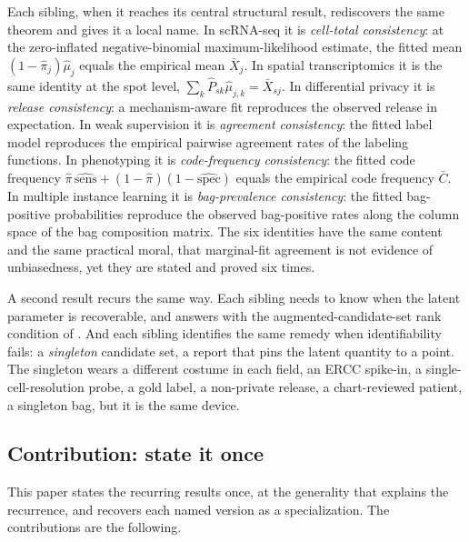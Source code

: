 Each sibling, when it reaches its central structural result,
rediscovers the same theorem and gives it a local name. In scRNA-seq
it is \emph{cell-total consistency}: at the zero-inflated
negative-binomial maximum-likelihood estimate, the fitted mean
$(1-\hat\pi_j)\hat\mu_j$ equals the empirical mean $\bar X_j$. In
spatial transcriptomics it is the same identity at the spot level,
$\sum_k \hat P_{sk}\hat\mu_{j,k} = \bar X_{sj}$. In differential
privacy it is \emph{release consistency}: a mechanism-aware fit
reproduces the observed release in expectation. In weak supervision it
is \emph{agreement consistency}: the fitted label model reproduces the
empirical pairwise agreement rates of the labeling functions. In
phenotyping it is \emph{code-frequency consistency}: the fitted code
frequency $\hat\pi\,\widehat{\mathrm{sens}} +
(1-\hat\pi)(1-\widehat{\mathrm{spec}})$ equals the empirical code
frequency $\bar C$. In multiple instance learning it is
\emph{bag-prevalence consistency}: the fitted bag-positive probabilities
reproduce the observed bag-positive rates along the column space of the
bag composition matrix. The six identities have the same content and the
same practical moral, that marginal-fit agreement is not evidence of
unbiasedness, yet they are stated and proved six times.

A second result recurs the same way. Each sibling needs to know when
the latent parameter is recoverable, and answers with the
augmented-candidate-set rank condition of \citet{towell2026masked}.
And each sibling identifies the same remedy when identifiability
fails: a \emph{singleton} candidate set, a report that pins the latent
quantity to a point. The singleton wears a different costume in each
field, an ERCC spike-in, a single-cell-resolution probe, a gold label,
a non-private release, a chart-reviewed patient, a singleton bag, but it
is the same device.

\subsection{Contribution: state it once}

This paper states the recurring results once, at the generality that
explains the recurrence, and recovers each named version as a
specialization. The contributions are the following.


